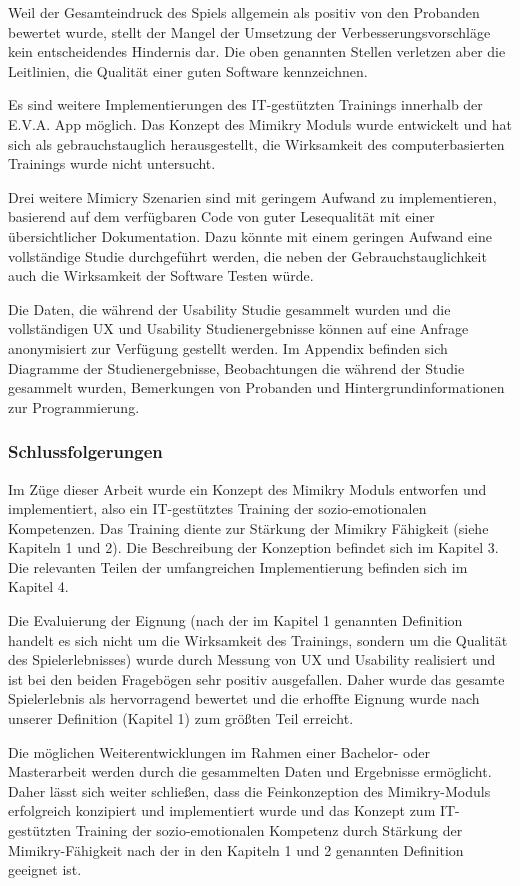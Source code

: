 Weil der Gesamteindruck des Spiels allgemein als positiv von den Probanden bewertet wurde, stellt der Mangel der Umsetzung der Verbesserungsvorschläge kein entscheidendes Hindernis dar. Die oben genannten Stellen verletzen aber die Leitlinien, die Qualität einer guten Software kennzeichnen. 

Es sind weitere Implementierungen des IT-gestützten Trainings innerhalb der E.V.A. App möglich. Das Konzept des Mimikry Moduls wurde entwickelt und hat sich als gebrauchstauglich herausgestellt, die Wirksamkeit des computerbasierten Trainings wurde nicht untersucht. 

Drei weitere Mimicry Szenarien sind mit geringem Aufwand zu implementieren, basierend auf dem verfügbaren Code von guter Lesequalität mit einer übersichtlicher Dokumentation. Dazu könnte mit einem geringen Aufwand eine vollständige Studie durchgeführt werden, die neben der Gebrauchstauglichkeit auch die Wirksamkeit der Software Testen würde.

Die Daten, die während der Usability Studie gesammelt wurden und die vollständigen UX und Usability Studienergebnisse können auf eine Anfrage anonymisiert zur Verfügung gestellt werden. Im Appendix befinden sich Diagramme der Studienergebnisse, Beobachtungen die während der Studie gesammelt wurden, Bemerkungen von Probanden und Hintergrundinformationen zur Programmierung.

\subsubsection{Schlussfolgerungen}
Im Züge dieser Arbeit wurde ein Konzept des Mimikry Moduls entworfen und implementiert, also ein IT-gestütztes Training der sozio-emotionalen Kompetenzen. Das Training diente zur Stärkung der Mimikry Fähigkeit (siehe Kapiteln 1 und 2). Die Beschreibung der Konzeption befindet sich im Kapitel 3. Die relevanten Teilen der umfangreichen Implementierung befinden sich im Kapitel 4. 

Die Evaluierung der Eignung (nach der im Kapitel 1 genannten Definition handelt es sich nicht um die Wirksamkeit des Trainings, sondern um die Qualität des Spielerlebnisses) wurde durch Messung von UX und Usability realisiert und ist bei den beiden Fragebögen sehr positiv ausgefallen. Daher wurde das gesamte Spielerlebnis als hervorragend bewertet und die erhoffte Eignung wurde nach unserer Definition (Kapitel 1) zum größten Teil erreicht. 

Die möglichen Weiterentwicklungen im Rahmen einer Bachelor- oder Masterarbeit werden durch die gesammelten Daten und Ergebnisse ermöglicht. Daher lässt sich weiter schließen, dass die Feinkonzeption des Mimikry-Moduls erfolgreich konzipiert und implementiert wurde und das Konzept zum IT-gestützten Training der sozio-emotionalen Kompetenz durch Stärkung der Mimikry-Fähigkeit nach der in den Kapiteln 1 und 2 genannten Definition geeignet ist.
